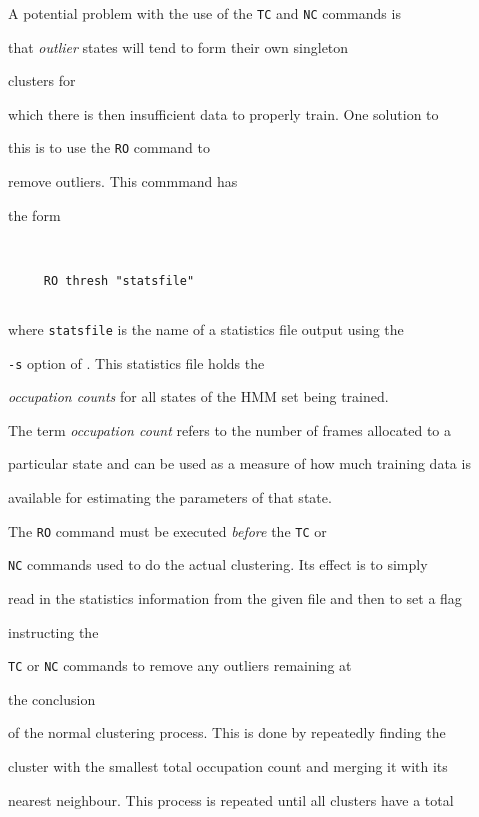 A potential problem with the use of the \texttt{TC} and \texttt{NC} commands is


that {\it outlier} states will tend to form their own singleton 


clusters for


which there is then insufficient data to properly train.  One solution to


this is to use the \texttt{RO} command to 


remove outliers.  This commmand has


the form


\begin{verbatim}


     RO thresh "statsfile"


\end{verbatim}


where \texttt{statsfile} is the name of a statistics file output using the


\texttt{-s} option of .  This statistics file holds the 


{\em occupation counts} for all states of the HMM set being trained.  


The term {\em occupation count} refers to the number of frames allocated to a


particular state and can be used as a measure of how much training data is


available for estimating the parameters of that state.  


The \texttt{RO} command must be executed {\it before} the \texttt{TC} or


\texttt{NC} commands used to do the actual clustering. Its effect is to simply


read in the statistics information from the given file and then to set a flag


instructing the


\texttt{TC} or \texttt{NC} commands to remove any outliers remaining at 


the conclusion


of the normal clustering process.  This is done by repeatedly finding the


cluster with the smallest total occupation count and merging it with its


nearest neighbour. This process is repeated until all clusters have a total


